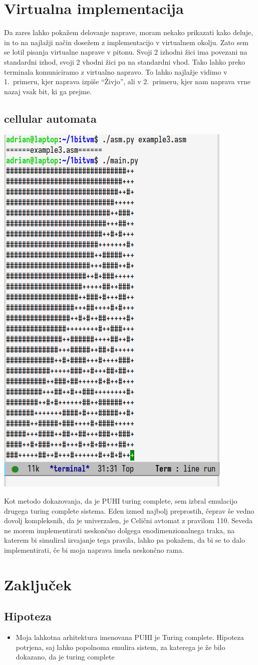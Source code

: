 \documentclass[12pt]{article}
\begin{document}
\section{Virtualna implementacija}
Da zares lahko pokažem delovanje naprave, moram nekako prikazati kako deluje, in to na najlažji način dosežem z implementacijo v virtualnem okolju.
Zato sem se lotil pisanja virtualne naprave v pitonu.
Svoji 2 izhodni žici ima povezani na standardni izhod, svoji 2 vhodni žici pa na standardni vhod.
Tako lahko preko terminala komuniciramo z virtualno napravo.
To lahko najlažje vidimo v 1.\ primeru, kjer naprava izpiše ``Živjo'', ali v 2.\ primeru, kjer nam naprava vrne nazaj vsak bit, ki ga prejme.
\subsection{cellular automata}
\begin{center}
  \includegraphics[width=.3\linewidth]{slike/pravilo110.png}
\end{center}
Kot metodo dokazovanja, da je PUHI turing complete, sem izbral emulacijo drugega turing complete sistema.
Eden izmed najbolj preprostih, čeprav še vedno dovolj kompleksnih, da je univerzalen, je Celični avtomat z pravilom 110.
Seveda ne morem implementirati neskončno dolgega enodimenzionalnega traka, na katerem bi simuliral izvajanje tega pravila, lahko pa pokažem, da bi se to dalo implementirati, če bi moja naprava imela neskončno rama.

\section{Zaključek}
\subsection{Hipoteza}
\begin{itemize}
  \item Moja lahkotna arhitektura imenovana PUHI je Turing complete.
  Hipoteza potrjena, saj lahko popolnoma emulira sistem, za katerega je že bilo dokazano, da je turing complete
\end{itemize}
\end{document}
